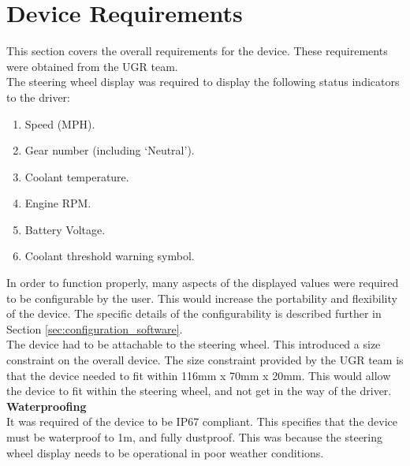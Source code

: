 \documentclass[a4paper,12pt]{article}
\begin{document}



\newpage
\section{Device Requirements}
\label{sec:device_requirements}

This section covers the overall requirements for the device. These requirements were obtained from the UGR team. \\

The steering wheel display was required to display the following status indicators to the driver:

\begin{enumerate}
  \item Speed (MPH).
  \item Gear number (including `Neutral').
  \item Coolant temperature.
  \item Engine RPM.
  \item Battery Voltage.
  \item Coolant threshold warning symbol.
\end{enumerate}

In order to function properly, many aspects of the displayed values were required to be configurable by the user. This would increase the portability and flexibility of the device. The specific details of the configurability is described further in Section \ref{sec:configuration_software}. \\

The device had to be attachable to the steering wheel. This introduced a size constraint on the overall device. The size constraint provided by the UGR team is that the device needed to fit within 116mm x 70mm x 20mm. This would allow the device to fit within the steering wheel, and not get in the way of the driver. \\

\textbf{Waterproofing} \\

It was required of the device to be IP67 compliant. This specifies that the device must be waterproof to 1m, and fully dustproof. This was because the steering wheel display needs to be operational in poor weather conditions. \\
\end{document}
